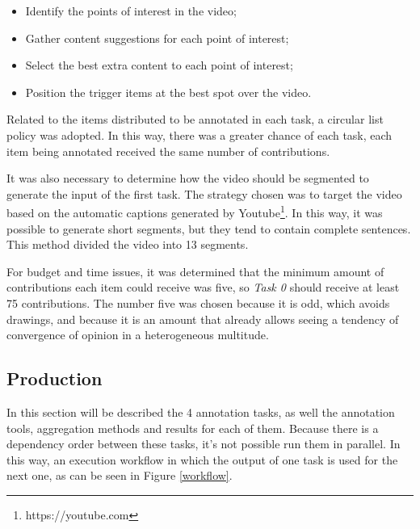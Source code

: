 \begin{itemize}
\item Identify the points of interest in the video; 
\item Gather content suggestions for each point of interest; 
\item Select the best extra content to each point of interest;
\item Position the trigger items at the best spot over the video. 
\end{itemize}

Related to the items distributed to be annotated in each task, a circular list policy was adopted. In this way, there was a greater chance of each task, each item being annotated received the same number of contributions.

It was also necessary to determine how the video should be segmented to generate the input of the first task. The strategy chosen was to target the video based on the automatic captions generated by Youtube\footnote{https://youtube.com}. In this way, it was possible to generate short segments, but they tend to contain complete sentences. This method divided the video into 13 segments.

For budget and time issues, it was determined that the minimum amount of contributions each item could receive was five, so \textit{Task 0} should receive at least 75 contributions. The number five was chosen because it is odd, which avoids drawings, and because it is an amount that already allows seeing a tendency of convergence of opinion in a heterogeneous multitude.



\subsection{Production}
In this section will be described the 4 annotation tasks, as well the annotation tools, aggregation methods and results for each of them. Because there is a dependency order between these tasks, it's not possible run them in parallel. In this way, an execution workflow in which the output of one task is used for the next one, as can be seen in Figure \ref{workflow}.


